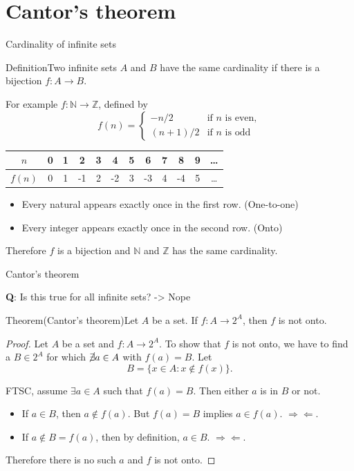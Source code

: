 \documentclass{beamer}
\def\bl[#1]#2{\begin{block}{#1}#2\end{block}}
\def\itemb{\begin{itemize}}
\def\iteme{\end{itemize}}
\begin{document}
\section{Cantor's theorem}
\begin{frame}{Cardinality of infinite sets}
\bl[Definition]{Two infinite sets $A$ and $B$  have the same cardinality if there is a bijection $f:A\to B$.}
For example $f:\mathbb{N}\to\mathbb{Z}$, defined by
\[
f(n)=\left\{\begin{array}{cc}
-n/2&\textrm{if $n$ is even},\\
(n+1)/2&\textrm{if $n$ is odd}
\end{array}\right.
\]
\begin{center}
\begin{tabular}{|c||c|c|c|c|c|c|c|c|c|c|c|}
\hline
$n$&0&1&2&3&4&5&6&7&8&9&\dots\\
\hline
$f(n)$&0&1&-1&2&-2&3&-3&4&-4&5&\dots\\
\hline
\end{tabular}
\end{center}
\itemb
\item Every natural appears exactly once in the first row. (One-to-one)
\item Every integer appears exactly once in the second row. (Onto)
\iteme
Therefore $f$ is a bijection and $\mathbb{N}$ and $\mathbb{Z}$ has the same cardinality.
\end{frame}

\begin{frame}{Cantor's theorem}
\bl[]{\textbf{Q}: Is this true for all infinite sets? -> Nope}
\bl[Theorem(Cantor's theorem)]{Let $A$ be a set. If $f:A\to 2^{A}$, then $f$ is not onto.}

\begin{proof}
Let $A$ be a set and $f:A\to 2^A$. To show that $f$ is not onto, we have to find a $B\in 2^A$ for which $\cancel{\exists}a\in A$ with $f(a)=B$. Let\vspace{-0.3cm}
\[
B=\{x\in A:x\notin f(x)\}.
\]\vspace{-0.7cm}

FTSC, assume $\exists a\in A$ such that $f(a)=B$. Then either $a$ is in $B$ or not.
\itemb
\item If $a\in B$, then $a\notin f(a)$. But $f(a)=B$ implies $a\in f(a)$. $\Rightarrow\Leftarrow$.
\item If $a\notin B=f(a)$, then by definition, $a\in B$. $\Rightarrow\Leftarrow$.
\iteme
Therefore there is no such $a$ and $f$ is not onto.
\end{proof}
\end{frame}
\end{document}

